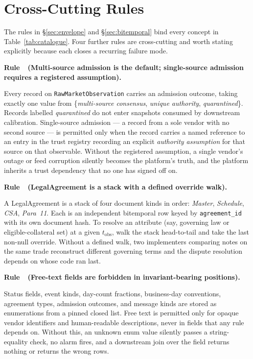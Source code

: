 \documentclass[11pt,a4paper]{article}
\newcounter{rul}
\newenvironment{rul}[1]{%
  \refstepcounter{rul}\par\medskip\noindent\textbf{Rule~\therul\ (#1).}\ %
}{\par\medskip}
\begin{document}
\section{Cross-Cutting Rules}\label{sec:rules}

The rules in \S\ref{sec:envelope} and \S\ref{sec:bitemporal} bind every concept in Table~\ref{tab:catalogue}. Four further rules are cross-cutting and worth stating explicitly because each closes a recurring failure mode.

\begin{rul}{Multi-source admission is the default; single-source admission requires a registered assumption}
Every record on \texttt{RawMarketObservation} carries an admission outcome, taking exactly one value from \{\emph{multi-source consensus}, \emph{unique authority}, \emph{quarantined}\}. Records labelled \emph{quarantined} do not enter snapshots consumed by downstream calibration. Single-source admission --- a record from a sole vendor with no second source --- is permitted only when the record carries a named reference to an entry in the trust registry recording an explicit \emph{authority assumption} for that source on that observable. Without the registered assumption, a single vendor's outage or feed corruption silently becomes the platform's truth, and the platform inherits a trust dependency that no one has signed off on.
\end{rul}

\begin{rul}{LegalAgreement is a stack with a defined override walk}
A LegalAgreement is a stack of four document kinds in order: \emph{Master}, \emph{Schedule}, \emph{CSA}, \emph{Para~11}. Each is an independent bitemporal row keyed by \texttt{agreement\_id} with its own document hash. To resolve an attribute (say, governing law or eligible-collateral set) at a given $t_{\text{obs}}$, walk the stack head-to-tail and take the last non-null override. Without a defined walk, two implementers comparing notes on the same trade reconstruct different governing terms and the dispute resolution depends on whose code ran last.
\end{rul}

\begin{rul}{Free-text fields are forbidden in invariant-bearing positions}
Status fields, event kinds, day-count fractions, business-day conventions, agreement types, admission outcomes, and message kinds are stored as enumerations from a pinned closed list. Free text is permitted only for opaque vendor identifiers and human-readable descriptions, never in fields that any rule depends on. Without this, an unknown enum value silently passes a string-equality check, no alarm fires, and a downstream join over the field returns nothing or returns the wrong rows.
\end{rul}
\end{document}

